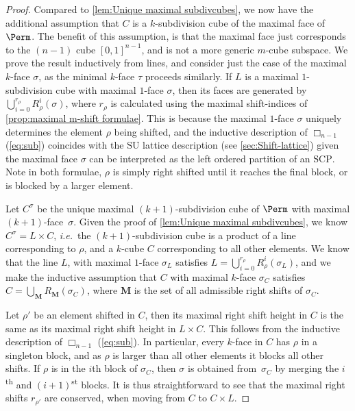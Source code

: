 \documentclass{amsart}
\theoremstyle{definition}
\newcommand{\ie}{\textit{i.e.}~} %
\newcommand{\ordinal}{\textsuperscript{th}} %
\newcommand{\ordinalst}{\textsuperscript{st}} %
\newcommand{\SU}{\mathrm{SU}}
\newcommand{\SCP}{\mathrm{SCP}}
\newcommand{\divcube}[1]{\Box_{#1}}
\begin{document}
\begin{proof}
Compared to \cref{lem:Unique maximal subdivcubes}, we now have the additional assumption that $C$ is a $k$-subdivision cube of the maximal face of $\Perm$.
The benefit of this assumption, is that the maximal face just corresponds to the $(n-1)$ cube $[0,1]^{n-1}$, and is not a more generic $m$-cube subspace. 
We prove the result inductively from lines, and consider just the case of the maximal $k$-face $\sigma$, as the minimal $k$-face $\tau$ proceeds similarly.
If $L$ is a maximal $1$-subdivision cube with maximal $1$-face $\sigma$, then its faces are generated by $\bigcup_{i=0}^{r_\rho} R_\rho^i(\sigma)$, where $r_\rho$ is calculated using the maximal shift-indices of \cref{prop:maximal m-shift formulae}.
This is because the maximal $1$-face $\sigma$ uniquely determines the element $\rho$ being shifted, and the inductive description of $\divcube{n-1}$ (\cref{eq:sub}) coincides with the $\SU$ lattice description (see \cref{sec:Shift-lattice}) given the maximal face $\sigma$ can be interpreted as the left ordered partition of an $\SCP$.
Note in both formulae, $\rho$ is simply right shifted until it reaches the final block, or is blocked by a larger element.

Let $C^\sigma$ be the unique maximal $(k+1)$-subdivision cube of $\Perm$ with maximal $(k+1)$-face~$\sigma$.
Given the proof of \cref{lem:Unique maximal subdivcubes}, we know $C^\sigma = L\times C$, \ie the $(k+1)$-subdivision cube is a product of a line corresponding to $\rho$, and a $k$-cube $C$ corresponding to all other elements.
We know that the line $L$, with maximal $1$-face $\sigma_L$ satisfies $L=\bigcup_{i=0}^{r_\rho} R_\rho^i(\sigma_L)$, and we make the inductive assumption that $C$ with maximal $k$-face $\sigma_C$ satisfies $C = \bigcup_{\mathbf{M}}R_\mathbf{M}(\sigma_C)$, where $\mathbf{M}$ is the set of all admissible right shifts of $\sigma_C$.

Let $\rho'$ be an element shifted in $C$, then its maximal right shift height in $C$ is the same as its maximal right shift height in $L\times C$.
This follows from the inductive description of $\divcube{n-1}$ (\cref{eq:sub}).
In particular, every $k$-face in $C$ has $\rho$ in a singleton block, and as $\rho$ is larger than all other elements it blocks all other shifts.
If $\rho$ is in the $i$th block of $\sigma_C$, then $\sigma$ is obtained from~$\sigma_C$ by merging the $i$\ordinal{} and $(i+1)$\ordinalst{} blocks.
It is thus straightforward to see that the maximal right shifts $r_{\rho'}$ are conserved, when moving from $C$ to $C\times L$.


\end{proof}
\end{document}
